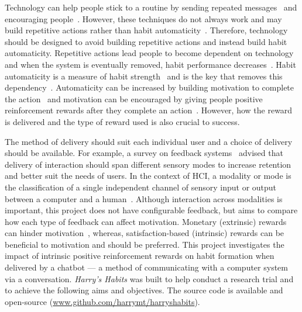 Technology can help people stick to a routine by sending repeated messages~\cite{chi_crowd_designed_motivation} and encouraging people~\cite{positive_reinforcement_pro}. However, these techniques do not always work and may build repetitive actions rather than habit automaticity~\cite{coaching_not_that_good}. Therefore, technology should be designed to avoid building repetitive actions and instead build habit automaticity. Repetitive actions lead people to become dependent on technology and when the system is eventually removed, habit performance decreases~\cite{article_dont_kick_habit, article_realtime_feedback_improving_medication_taking}. Habit automaticity is a measure of habit strength~\cite{article_4q_SRBAI} and is the key that removes this dependency~\cite{article_beyond_self_tracking_designing_apps}. Automaticity can be increased by building motivation to complete the action~\cite{article_a_self_efficacy, article_meta_analytic_review_intrinsic_motivation} and motivation can be encouraged by giving people positive reinforcement rewards after they complete an action~\cite{positive_reinforcement_pro}. However, how the reward is delivered and the type of reward used is also crucial to success.

The method of delivery should suit each individual user and a choice of delivery should be available. For example, a survey on feedback systems~\cite{article_user_centred_multimodal_reminders} advised that delivery of interaction should span different sensory modes to increase retention and better suit the needs of users. In the context of HCI, a modality or mode is the classification of a single independent channel of sensory input or output between a computer and a human~\cite{hci_modality_definition}. Although interaction across modalities is important, this project does not have configurable feedback, but aims to compare how each type of feedback can affect motivation. Monetary (extrinsic) rewards can hinder motivation~\cite{article_meta_analytic_review_intrinsic_motivation}, whereas, satisfaction-based (intrinsic) rewards can be beneficial to motivation and should be preferred. This project investigates the impact of intrinsic positive reinforcement rewards on habit formation when delivered by a chatbot --- a method of communicating with a computer system via a conversation. \textit{Harry's Habits} was built to help conduct a research trial and to achieve the following aims and objectives. The source code is available and open-source (\url{www.github.com/harrymt/harryshabits}).


